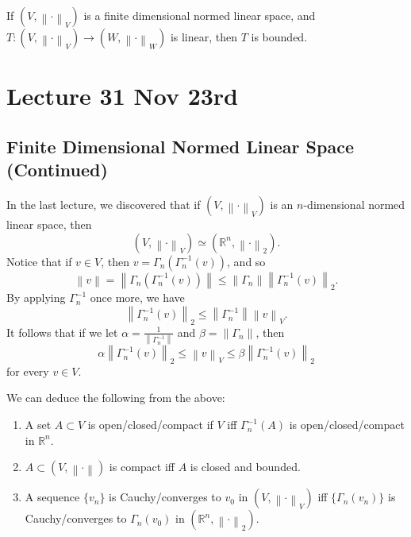 \documentclass[notoc,notitlepage]{tufte-book}
\newcommand{\norm}[1]{\left\| #1 \right\|}
\begin{document}
\begin{crly}\label{crly:all_linear_maps_from_a_finite_dimensional_normed_linear_space_to_any_normed_linear_space_is_bounded}
  If $(V, \norm\cdot_V)$ is a finite dimensional normed linear space, and $T : (V, \norm\cdot_V) \to (W, \norm\cdot_W)$ is linear, then $T$ is bounded.
\end{crly}



\chapter{Lecture 31 Nov 23rd}%
\label{chp:lecture_31_nov_23rd}

\section{Finite Dimensional Normed Linear Space (Continued)}%
\label{sec:finite_dimensional_normed_linear_space_continued}

In the last lecture, we discovered that if $(V, \norm\cdot_V)$ is an $n$-dimensional normed linear space, then
\begin{equation*}
  (V, \norm\cdot_V) \simeq (\mathbb{R}^n, \norm\cdot_2 ).
\end{equation*}
Notice that if $v \in V$, then $v = \Gamma_n(\Gamma_n^{-1}(v))$, and so
\begin{equation*}
  \norm{v} = \norm{ \Gamma_n( \Gamma_n^{-1}(v) ) } \leq \norm{ \Gamma_n } \norm{ \Gamma_n^{-1}(v) }_2.
\end{equation*}
By applying $\Gamma_n^{-1}$ once more, we have
\begin{equation*}
  \norm{ \Gamma_n^{-1}(v) }_2 \leq \norm{\Gamma_n^{-1}}\norm{v}_V.
\end{equation*}
It follows that if we let $\alpha = \frac{1}{\norm{\Gamma_n^{-1}}}$ and $\beta = \norm{\Gamma_n}$, then
\begin{equation*}
  \alpha \norm{ \Gamma_n^{-1}(v) }_2 \leq \norm{v}_V \leq \beta \norm{ \Gamma_n^{-1}(v) }_2
\end{equation*}
for every $v \in V$.

We can deduce the following from the above:
\begin{enumerate}
  \item A set $A \subset V$ is open/closed/compact if $V$ iff $\Gamma_n^{-1}(A)$ is open/closed/compact in $\mathbb{R}^n$.
  \item $A \subset (V, \norm\cdot)$ is compact iff $A$ is closed and bounded.
  \item A sequence $\{ v_n \}$ is Cauchy/converges to $v_0$ in $(V, \norm\cdot_V)$ iff $\{ \Gamma_n(v_n) \}$ is Cauchy/converges to $\Gamma_n(v_0)$ in $(\mathbb{R}^n, \norm\cdot_2)$.
\end{enumerate}
\end{document}
